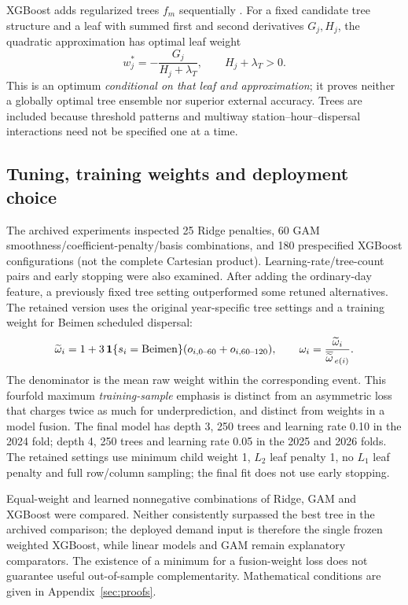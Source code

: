 XGBoost adds regularized trees $f_m$ sequentially \cite{xgb}. For a fixed candidate tree structure and a leaf with summed first and second derivatives $G_j,H_j$, the quadratic approximation has optimal leaf weight
\begin{equation}
w_j^*=-\frac{G_j}{H_j+\lambda_T},\qquad H_j+\lambda_T>0.
\label{eq:leaf}
\end{equation}
This is an optimum \emph{conditional on that leaf and approximation}; it proves neither a globally optimal tree ensemble nor superior external accuracy. Trees are included because threshold patterns and multiway station--hour--dispersal interactions need not be specified one at a time.

\subsection{Tuning, training weights and deployment choice}
The archived experiments inspected 25 Ridge penalties, 60 GAM smoothness/coefficient-penalty/basis combinations, and 180 prespecified XGBoost configurations (not the complete Cartesian product). Learning-rate/tree-count pairs and early stopping were also examined. After adding the ordinary-day feature, a previously fixed tree setting outperformed some retuned alternatives. The retained version uses the original year-specific tree settings and a training weight for Beimen scheduled dispersal:
\begin{equation}
\widetilde\omega_i=
1+3\,\mathbf 1\{s_i=\mathrm{Beimen}\}(o_{i,0\text{--}60}+o_{i,60\text{--}120}),
\qquad
\omega_i=\frac{\widetilde\omega_i}
{\overline{\widetilde\omega}_{\,e(i)}}.
\label{eq:weights}
\end{equation}
The denominator is the mean raw weight within the corresponding event. This fourfold maximum \emph{training-sample} emphasis is distinct from an asymmetric loss that charges twice as much for underprediction, and distinct from weights in a model fusion. The final model has depth 3, 250 trees and learning rate 0.10 in the 2024 fold; depth 4, 250 trees and learning rate 0.05 in the 2025 and 2026 folds. The retained settings use minimum child weight 1, $L_2$ leaf penalty 1, no $L_1$ leaf penalty and full row/column sampling; the final fit does not use early stopping.

Equal-weight and learned nonnegative combinations of Ridge, GAM and XGBoost were compared. Neither consistently surpassed the best tree in the archived comparison; the deployed demand input is therefore the single frozen weighted XGBoost, while linear models and GAM remain explanatory comparators. The existence of a minimum for a fusion-weight loss does not guarantee useful out-of-sample complementarity. Mathematical conditions are given in Appendix~\ref{sec:proofs}.

